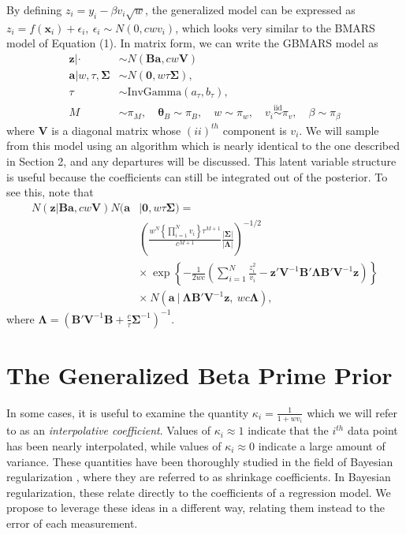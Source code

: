 \documentclass{article} %
\begin{document}
By defining $z_i = y_i - \beta v_i\sqrt w$, the generalized model can be expressed as $z_i = f(\bm x_i) + \epsilon_i, \ \epsilon_i \sim N(0, cwv_i)$, which looks very similar to the BMARS model of Equation (1). In matrix form, we can write the GBMARS model as
\begin{equation}
\label{eq:smgbmars}
    \begin{aligned}
    \bm z|\cdot &\sim N\left(\bm B \bm a, cw\bm V\right) \\
    \bm a|w,\tau,\bm\Sigma &\sim N\left(\bm 0, w\tau \bm\Sigma\right), \\
    \tau &\sim \text{InvGamma}(a_\tau, b_\tau), \\
    M &\sim \pi_M, \quad
    \bm\theta_B \sim \pi_B, \quad
    w \sim \pi_w, \quad
    v_i \stackrel{\text{iid}}{\sim} \pi_v, \quad
    \beta \sim \pi_\beta
    \end{aligned}
\end{equation}
where $\bm V$ is a diagonal matrix whose $(ii)^{th}$ component is $v_i$. We will sample from this model using an algorithm which is nearly identical to the one described in Section 2, and any departures will be discussed. This latent variable structure is useful because the coefficients can still be integrated out of the posterior. To see this, note that 
\begin{equation}
\label{eq:smgbmars_prod}
\begin{aligned}
N(\bm z | \bm B \bm a, cw\bm V)N(\bm a &| \bm 0, w\tau\bm\Sigma) = \\
&\left(\frac{w^N \left\{\prod_{i=1}^Nv_i\right\} \tau^{M+1}}{c^{M+1}}\frac{|\bm\Sigma|}{|\bm\Lambda|}\right)^{-1/2} \\
& \times  \ \exp\left\{-\frac{1}{2wc}\left(\sum_{i=1}^N\frac{z_i^2}{v_i} - \bm z' \bm V^{-1}\bm B'\bm\Lambda\bm B'\bm V^{-1}\bm z\right) \right\} \\
&\times \ N\left(\bm a \ \bigg| \ \bm\Lambda\bm B'\bm V^{-1}\bm z, \ wc\bm\Lambda\right),
\end{aligned}
\end{equation}
where $\bm\Lambda = \left(\bm B'\bm V^{-1}\bm B + \frac{c}{\tau}\bm\Sigma^{-1}\right)^{-1}$. 

\section{The Generalized Beta Prime Prior}
\label{sec:smGBP}

In some cases, it is useful to examine the quantity $\kappa_i = \frac{1}{1+wv_i}$ which we will refer to as an {\it interpolative coefficient}. Values of $\kappa_i \approx 1$ indicate that the $i^{th}$ data point has been nearly interpolated, while values of $\kappa_i \approx 0$ indicate a large amount of variance. These quantities have been thoroughly studied in the field of Bayesian regularization \citep{carvalho2009}, where they are referred to as shrinkage coefficients. In Bayesian regularization, these relate directly to the coefficients of a regression model. We propose to leverage these ideas in a different way, relating them instead to the error of each measurement. 
\end{document}
